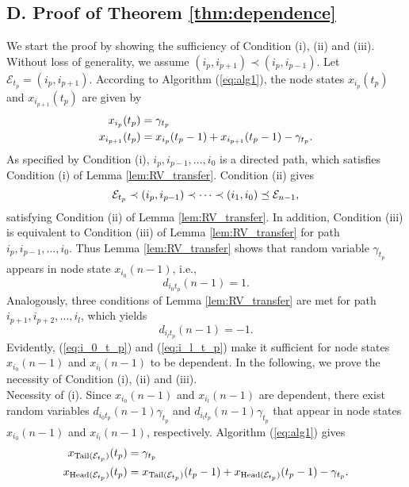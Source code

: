 \documentclass[a4paper, 11pt]{article}
\newcommand{\1}{\mathbf{1}}
\newcommand{\asf}{\mathcal{E}}
\newcommand{\Head}{\textnormal{Head}}
\newcommand{\Tail}{\textnormal{Tail}}
\begin{document}
\subsection*{D. Proof of Theorem \ref{thm:dependence}}
We start the proof by showing the sufficiency of Condition (i), (ii) and (iii). Without loss of generality, we assume $(i_p,i_{p+1})\prec(i_p,i_{p-1})$. Let $\asf_{t_p}=(i_p,i_{p+1})$. According to Algorithm (\ref{eq:alg1}), the node states $x_{i_p}(t_p)$ and $x_{i_{p+1}}(t_p)$ are given by
\begin{align}
x_{i_p}(t_p) &= \gamma_{t_p}\notag\\
x_{i_{p+1}}(t_p) &= x_{i_p}(t_p-1) + x_{i_{p+1}}(t_p-1) - \gamma_{t_p}. \notag
\end{align}
As specified by Condition (i), $i_p,i_{p-1},\dots,i_0$ is a directed path, which satisfies Condition (i) of Lemma \ref{lem:RV_transfer}. Condition (ii) gives
\begin{equation}\notag
\asf_{t_p}\prec(i_p,i_{p-1})\prec\dots\prec(i_1,i_0)\preceq\asf_{n-1 },
\end{equation}
satisfying Condition (ii) of Lemma \ref{lem:RV_transfer}. In addition, Condition (iii) is equivalent to Condition (iii) of Lemma \ref{lem:RV_transfer} for path $i_p,i_{p-1},\dots,i_0$. Thus Lemma \ref{lem:RV_transfer} shows that random variable $\gamma_{t_p}$ appears in node state $x_{i_0}(n-1 )$, i.e.,
\begin{equation}\label{eq:i_0_t_p}
d_{i_0 t_p}(n-1 )=1.
\end{equation}
Analogously, three conditions of Lemma \ref{lem:RV_transfer} are met for path $i_{p+1},i_{p+2},\dots,i_l$, which yields
\begin{equation}\label{eq:i_l_t_p}
d_{i_l t_p}(n-1 )=-1.
\end{equation}
Evidently, (\ref{eq:i_0_t_p}) and (\ref{eq:i_l_t_p}) make it sufficient for node states $x_{i_0}(n-1 )$ and $x_{i_l}(n-1 )$ to be dependent.
In the following, we prove the necessity of Condition (i), (ii) and (iii).\\
Necessity of (i). Since $x_{i_0}(n-1 )$ and $x_{i_l}(n-1 )$ are dependent, there exist random variables $d_{i_0 t_p}(n-1 )\gamma_{t_p}$ and $d_{i_l t_p}(n-1 )\gamma_{t_p}$ that appear in node states $x_{i_0}(n-1 )$ and $x_{i_l}(n-1 )$, respectively. Algorithm (\ref{eq:alg1}) gives
\begin{align}
x_{\Tail(\asf_{t_p})}(t_p) &= \gamma_{t_p}\notag\\
x_{\Head(\asf_{t_p})}(t_p) &= x_{\Tail(\asf_{t_p})}(t_p-1) + x_{\Head(\asf_{t_p})}(t_p-1) - \gamma_{t_p}. \notag
\end{align}
\end{document}
